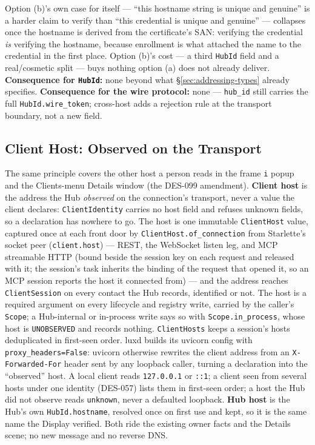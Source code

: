 \documentclass[a4paper,10pt]{article}
\newcommand{\field}[1]{\texttt{#1}}
\begin{document}
Option (b)'s own case for itself --- ``this hostname string is unique and
genuine'' is a harder claim to verify than ``this credential is unique and
genuine'' --- collapses once the hostname is derived from the certificate's
SAN: verifying the credential \emph{is} verifying the hostname, because
enrollment is what attached the name to the credential in the first place.
Option (b)'s cost --- a third \texttt{HubId} field and a real/cosmetic
split --- buys nothing option (a) does not already deliver.
\textbf{Consequence for \texttt{HubId}:} none beyond what
\S\ref{sec:addressing-types} already specifies.  \textbf{Consequence for
the wire protocol:} none --- \field{hub\_id} still carries the full
\field{HubId.wire\_token}; cross-host adds a rejection rule at the
transport boundary, not a new field.

\subsection{Client Host: Observed on the Transport}\label{sec:client-host}

The same principle covers the other host a person reads in the frame
\texttt{i} popup and the Clients-menu Details window (the DES-099
amendment).  \textbf{Client host} is the address the Hub \emph{observed}
on the connection's transport, never a value the client declares:
\texttt{ClientIdentity} carries no host field and refuses unknown fields,
so a declaration has nowhere to go.  The host is one immutable
\texttt{ClientHost} value, captured once at each front door by
\texttt{ClientHost.of\_connection} from Starlette's socket peer
(\field{client.host}) --- REST,
the WebSocket listen leg, and MCP streamable HTTP (bound beside the
session key on each request and released with it; the session's task
inherits the binding of the request that opened it, so an MCP session
reports the host it connected from) --- and the address reaches
\texttt{ClientSession} on every contact the Hub records, identified or
not.  The host is a required argument on every lifecycle and registry
write, carried by the caller's \texttt{Scope}; a Hub-internal or
in-process write says so with \texttt{Scope.in\_process}, whose host is
\texttt{UNOBSERVED} and records nothing.  \texttt{ClientHosts} keeps a
session's hosts deduplicated in first-seen order.  luxd builds its
uvicorn config with \field{proxy\_headers=False}: uvicorn otherwise
rewrites the client address from an \texttt{X-Forwarded-For} header sent by
any loopback caller, turning a declaration into the ``observed'' host.  A
local client reads \texttt{127.0.0.1} or \texttt{::1}; a client seen from
several hosts under one identity (DES-057) lists them in first-seen order;
a host the Hub did not observe reads \texttt{unknown}, never a defaulted
loopback.  \textbf{Hub host} is the Hub's own \field{HubId.hostname},
resolved once on first use and kept, so it is the same name the Display
verified.  Both ride the existing owner facts and the Details scene; no new
message and no reverse DNS.
\end{document}
